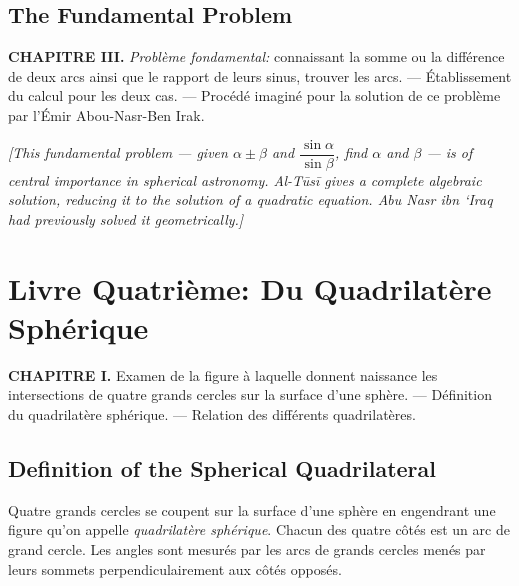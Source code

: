 \documentclass[11pt,a4paper]{article}
\theoremstyle{plain}
\theoremstyle{definition}
\theoremstyle{remark}
\begin{document}
\subsection{The Fundamental Problem}
\label{sec:fundamental-problem}


\textbf{CHAPITRE III.} \textit{Problème fondamental:} connaissant la somme ou la différence de deux arcs ainsi que le rapport de leurs sinus, trouver les arcs. --- Établissement du calcul pour les deux cas. --- Procédé imaginé pour la solution de ce problème par l'Émir Abou-Nasr-Ben Irak.


\noindent\textit{[This fundamental problem --- given $\alpha \pm \beta$ and $\dfrac{\sin\alpha}{\sin\beta}$, find $\alpha$ and $\beta$ --- is of central importance in spherical astronomy. Al-Tūsī gives a complete algebraic solution, reducing it to the solution of a quadratic equation. Abu Nasr ibn `Iraq had previously solved it geometrically.]}

\clearpage

\section{Livre Quatrième: Du Quadrilatère Sphérique}
\label{sec:livre4}


\textbf{CHAPITRE I.} Examen de la figure à laquelle donnent naissance les intersections de quatre grands cercles sur la surface d'une sphère. --- Définition du quadrilatère sphérique. --- Relation des différents quadrilatères.


\subsection{Definition of the Spherical Quadrilateral}
\label{sec:def-sph-quad}


Quatre grands cercles se coupent sur la surface d'une sphère en engendrant une figure qu'on appelle \textit{quadrilatère sphérique}. Chacun des quatre côtés est un arc de grand cercle. Les angles sont mesurés par les arcs de grands cercles menés par leurs sommets perpendiculairement aux côtés opposés.


\begin{center}
\end{center}
\end{document}
